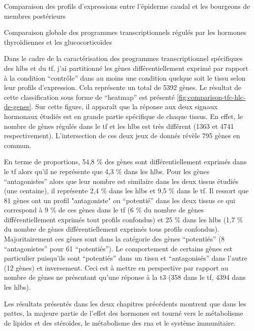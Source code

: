 \documentclass[../main.tex]{subfiles}
\begin{document}
\begin{chapter}{Comparaison des profils d'expressions entre l'épiderme caudal et les bourgeons de membres postérieurs}

\begin{section}{Comparaison globale des programmes transcriptionnels régulés par les hormones thyroïdiennes et les glucocorticoïdes}

Dans le cadre de la caractérisation des programmes transcriptionnel spécifiques des \glspl{hlb} et du \gls{tf}, j'ai partitionné les gènes différentiellement exprimé par rapport à la condition ``contrôle'' dans au moins une condition quelque soit le tissu selon leur profils d'expression.
Cela représente un total de 5392 gènes.
Le résultat de cette classification sous forme de ``heatmap'' est présenté \autoref{fig:comparison-tfc-hlc-de-genes}.
Sur cette figure, il apparaît que la réponse aux deux signaux hormonaux étudiés est en grande partie spécifique de chaque tissus.
En effet, le nombre de gènes régulés dans le \gls{tf} et les \glspl{hlb} est très différent (1363 et 4741 respectivement).
L'intersection de ces deux jeux de donnés révèle 795 gènes en commun.
\par
En terme de proportions, 54,8 \% des gènes sont différentiellement exprimés dans le \gls{tf} alors qu'il ne représente que 4,3 \% dans les \glspl{hlb}.
Pour les gènes ``antagonistes'' alors que leur nombre est similaire dans les deux tissus étudiés (une centaine), il représente 2,4 \% dans les \glspl{hlb} et 9,5 \% dans le \gls{tf}.
Il ressort que 81 gènes ont un profil "antagoniste" ou ``potentié'' dans les deux tissus ce qui correspond à 9 \% de ces gènes dans le \gls{tf} (6 \% du nombre de gènes différentiellement exprimés tout profils confondus) et 25 \% dans les \glspl{hlb} (1,7 \% du nombre de gènes différentiellement exprimés tous profils confondus).
Majoritairement ces gènes sont dans la catégorie des gènes ``potentiés'' (8 ``antagonistes'' pour 61 ``potentiés'').
Le comportement de certains gènes est particulier puisqu'ils sont ``potentiés'' dans un tissu et ``antagonisés'' dans l'autre (12 gènes) et inversement.
Ceci est à mettre en perspective par rapport au nombre de gènes ne présentant qu'une réponse à la \gls{t3} (358 dans le \gls{tf}, 4394 dans les \glspl{hlb}).
\par
Les résultats présentés dans les deux chapitres précédents montrent que dans les pattes, la majeure partie de l'effet des hormones est tourné vers le métabolisme de lipides et des stéroïdes, le métabolisme des \gls{rna} et le système immunitaire.

\end{section}
\end{chapter}
\end{document}
